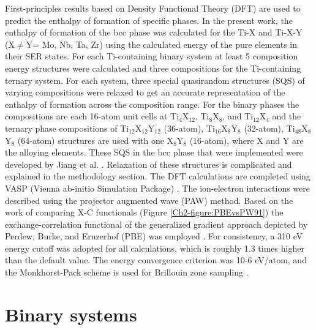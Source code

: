 First-principles results based on Density Functional Theory (DFT) are used to predict the enthalpy of formation of specific phases. In the present work, the enthalpy of formation of the bcc phase was calculated for the Ti-X and Ti-X-Y (X$\neq$Y= Mo, Nb, Ta, Zr) using the calculated energy of the pure elements in their SER states. For each Ti-containing binary system at least 5 composition energy structures were calculated and three compositions for the Ti-containing ternary system. For each system, three special quasirandom structures (SQS) of varying compositions were relaxed to get an accurate representation of the enthalpy of formation across the composition range. For the binary phases the compositions are each 16-atom unit cells at Ti$_4$X$_{12}$, Ti$_8$X$_8$, and Ti$_{12}$X$_4$ and the ternary phase compositions of Ti$_{12}$X$_{12}$Y$_{12}$ (36-atom), Ti$_{16}$X$_8$Y$_8$ (32-atom), Ti$_{48}$X$_8$Y$_8$ (64-atom) structures are used with one X$_8$Y$_8$ (16-atom), where X and Y are the alloying elements. These SQS in the bcc phase that were implemented were developed by Jiang et al. \cite{Jiang2004,Jiang2009}. Relaxation of these structures is complicated and explained in the methodology section. The DFT calculations are completed using VASP (Vienna ab-initio Simulation Package) \cite{Kresse1996}. The ion-electron interactions were described using the projector augmented wave (PAW) \cite{Kresse1999,Blochl1994} method. Based on the work of comparing X-C functionals (Figure \ref{Ch2-figure:PBEvsPW91}) the exchange-correlation functional of the generalized gradient approach depicted by Perdew, Burke, and Ernzerhof (PBE) was employed \cite{Perdew1996a}. For consistency, a 310 eV energy cutoff was adopted for all calculations, which is roughly 1.3 times higher than the default value. The energy convergence criterion was 10-6 eV/atom, and the Monkhorst-Pack scheme is used for Brillouin zone sampling \cite{Kresse1996,Monkhorst1976a}. 

\section{Binary systems}

